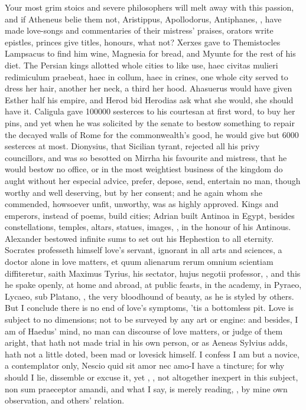 Your most grim stoics and severe philosophers will melt away with this
passion, and if Atheneus belie them not, Aristippus, Apollodorus,
Antiphanes, \etc{}, have made love-songs and commentaries of their
mistress' praises, orators write epistles, princes give titles,
honours, what not? Xerxes gave to Themistocles Lampsacus to find
him wine, Magnesia for bread, and Myunte for the rest of his diet. The
Persian kings allotted whole cities to like use, haec civitas
mulieri redimiculum praebeat, haec in collum, haec in crines, one whole
city served to dress her hair, another her neck, a third her hood.
Ahasuerus would have given Esther half his empire, and
Herod bid Herodias ask what she would, she should have it.
Caligula gave 100\thinspace{}000 sesterces to his courtesan at first word, to buy
her pins, and yet when he was solicited by the senate to bestow
something to repair the decayed walls of Rome for the commonwealth's
good, he would give but 6000 sesterces at most. Dionysius, that
Sicilian tyrant, rejected all his privy councillors, and was so
besotted on Mirrha his favourite and mistress, that he would bestow no
office, or in the most weightiest business of the kingdom do aught
without her especial advice, prefer, depose, send, entertain no man,
though worthy and well deserving, but by her consent; and he again whom
she commended, howsoever unfit, unworthy, was as highly approved. Kings
and emperors, instead of poems, build cities; Adrian built Antinoa in
Egypt, besides constellations, temples, altars, statues, images, \etc{},
in the honour of his Antinous. Alexander bestowed infinite sums to set
out his Hephestion to all eternity. Socrates professeth himself
love's servant, ignorant in all arts and sciences, a doctor alone in
love matters, et quum alienarum rerum omnium scientiam diffiteretur,
saith Maximus Tyrius, his sectator, hujus negotii professor, \etc{},
and this he spake openly, at home and abroad, at public feasts, in the
academy, in Pyraeo, Lycaeo, sub Platano, \etc{}, the very bloodhound of
beauty, as he is styled by others. But I conclude there is no end of
love's symptoms, 'tis a bottomless pit. Love is subject to no
dimensions; not to be surveyed by any art or engine: and besides, I am
of Haedus' mind, no man can discourse of love matters, or judge
of them aright, that hath not made trial in his own person, or as
Aeneas Sylvius adds, hath not a little doted, been mad or
lovesick himself. I confess I am but a novice, a contemplator only,
Nescio quid sit amor nec amo-I have a tincture; for why should I
lie, dissemble or excuse it, yet , \etc{}, not altogether inexpert
in this subject, non sum praeceptor amandi, and what I say, is merely
reading, , by mine own observation, and
others' relation.

